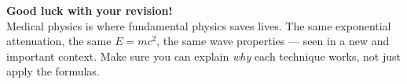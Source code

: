 \vspace{1em}
\begin{motivationbox}
\centering
\textbf{\color{darkblue}Good luck with your revision!}\\[0.2em]
{\color{darkgray}\small Medical physics is where fundamental physics saves lives. The same exponential attenuation, the same $E = mc^2$, the same wave properties — seen in a new and important context. Make sure you can explain \emph{why} each technique works, not just apply the formulas.}
\end{motivationbox}

